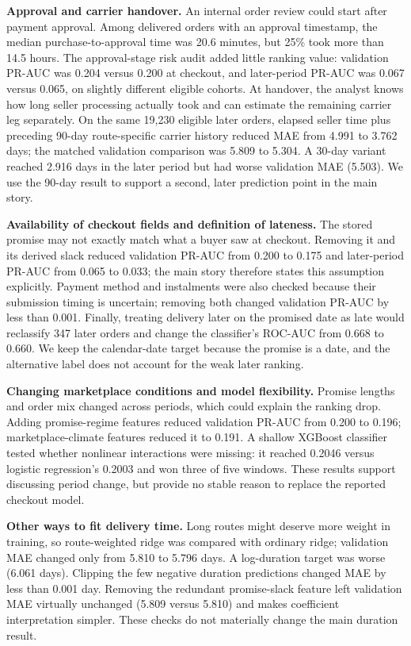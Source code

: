 \documentclass[12pt,a4paper]{article}
\begin{document}
\textbf{Approval and carrier handover.} An internal order review could start after payment approval. Among delivered orders with an approval timestamp, the median purchase-to-approval time was 20.6 minutes, but 25\% took more than 14.5 hours. The approval-stage risk audit added little ranking value: validation PR-AUC was 0.204 versus 0.200 at checkout, and later-period PR-AUC was 0.067 versus 0.065, on slightly different eligible cohorts. At handover, the analyst knows how long seller processing actually took and can estimate the remaining carrier leg separately. On the same 19,230 eligible later orders, elapsed seller time plus preceding 90-day route-specific carrier history reduced MAE from 4.991 to 3.762 days; the matched validation comparison was 5.809 to 5.304. A 30-day variant reached 2.916 days in the later period but had worse validation MAE (5.503). We use the 90-day result to support a second, later prediction point in the main story.

\textbf{Availability of checkout fields and definition of lateness.} The stored promise may not exactly match what a buyer saw at checkout. Removing it and its derived slack reduced validation PR-AUC from 0.200 to 0.175 and later-period PR-AUC from 0.065 to 0.033; the main story therefore states this assumption explicitly. Payment method and instalments were also checked because their submission timing is uncertain; removing both changed validation PR-AUC by less than 0.001. Finally, treating delivery later on the promised date as late would reclassify 347 later orders and change the classifier's ROC-AUC from 0.668 to 0.660. We keep the calendar-date target because the promise is a date, and the alternative label does not account for the weak later ranking.

\textbf{Changing marketplace conditions and model flexibility.} Promise lengths and order mix changed across periods, which could explain the ranking drop. Adding promise-regime features reduced validation PR-AUC from 0.200 to 0.196; marketplace-climate features reduced it to 0.191. A shallow XGBoost classifier tested whether nonlinear interactions were missing: it reached 0.2046 versus logistic regression's 0.2003 and won three of five windows. These results support discussing period change, but provide no stable reason to replace the reported checkout model.

\textbf{Other ways to fit delivery time.} Long routes might deserve more weight in training, so route-weighted ridge was compared with ordinary ridge; validation MAE changed only from 5.810 to 5.796 days. A log-duration target was worse (6.061 days). Clipping the few negative duration predictions changed MAE by less than 0.001 day. Removing the redundant promise-slack feature left validation MAE virtually unchanged (5.809 versus 5.810) and makes coefficient interpretation simpler. These checks do not materially change the main duration result.
\end{document}
